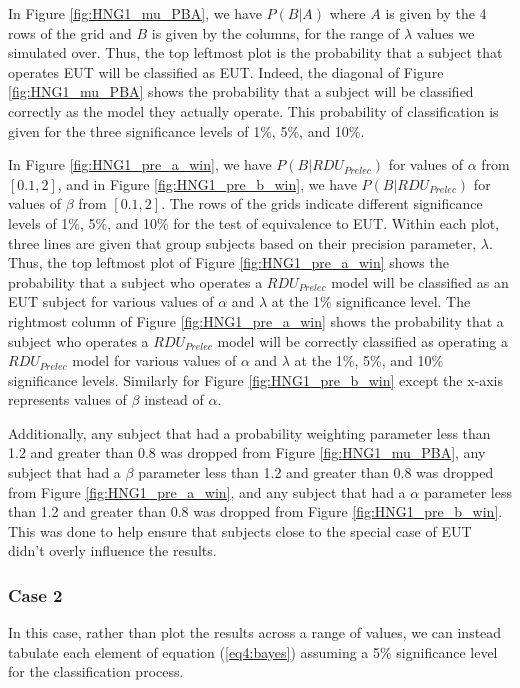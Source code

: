 \documentclass[../main.tex]{subfiles}
\begin{document}
In Figure \ref{fig:HNG1_mu_PBA}, we have $P(B|A)$ where $A$ is given by the 4 rows of the grid and $B$ is given by the columns, for the range of $\lambda$ values we simulated over.
Thus, the top leftmost plot is the probability that a subject that operates EUT will be classified as EUT.
Indeed, the diagonal of Figure \ref{fig:HNG1_mu_PBA} shows the probability that a subject will be classified correctly as the model they actually operate.
This probability of classification is given for the three significance levels of 1\%, 5\%, and 10\%.

In Figure \ref{fig:HNG1_pre_a_win}, we have $P(B|\mathit{RDU_{Prelec}})$ for values of $\alpha$ from $[0.1, 2]$, and in Figure \ref{fig:HNG1_pre_b_win}, we have $P(B|\mathit{RDU_{Prelec}})$ for values of $\beta$ from $[0.1, 2]$.
The rows of the grids indicate different significance levels of 1\%, 5\%, and 10\% for the test of equivalence to EUT.
Within each plot, three lines are given that group subjects based on their precision parameter, $\lambda$.
Thus, the top leftmost plot of Figure \ref{fig:HNG1_pre_a_win} shows the probability that a subject who operates a $\mathit{RDU_{Prelec}}$ model will be classified as an EUT subject for various values of $\alpha$ and $\lambda$ at the 1\% significance level.
The rightmost column of Figure \ref{fig:HNG1_pre_a_win} shows the probability that a subject who operates a $\mathit{RDU_{Prelec}}$ model will be correctly classified as operating a $\mathit{RDU_{Prelec}}$ model for various values of $\alpha$ and $\lambda$ at the 1\%, 5\%, and 10\% significance levels.
Similarly for Figure \ref{fig:HNG1_pre_b_win} except the x-axis represents values of $\beta$ instead of $\alpha$.

Additionally, any subject that had a probability weighting parameter less than 1.2 and greater than 0.8 was dropped from Figure \ref{fig:HNG1_mu_PBA}, any subject that had a $\beta$ parameter less than 1.2 and greater than 0.8 was dropped from Figure \ref{fig:HNG1_pre_a_win}, and any subject that had a $\alpha$ parameter less than 1.2 and greater than 0.8 was dropped from Figure \ref{fig:HNG1_pre_b_win}.
This was done to help ensure that subjects close to the special case of EUT didn't overly influence the results.

\subsubsection{Case 2}

In this case, rather than plot the results across a range of values, we can instead tabulate each element of equation (\ref{eq4:bayes}) assuming a 5\% significance level for the classification process.
\end{document}
